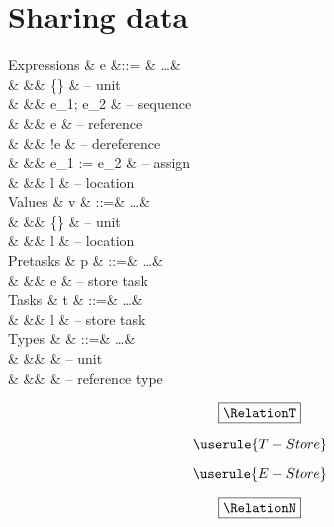 
\section{Sharing data}

\statefultrue

\begin{grammar}
  Expressions
    & e    &::= & \ldots          & \\
    &      &\mid& \{\}            & – unit \\
    &      &\mid& e_1; e_2        & – sequence \\
    &      &\mid& \Ref e          & – reference \\
    &      &\mid& !e              & – dereference \\
    &      &\mid& e_1 := e_2      & – assign \\
    &      &\mid& l               & – location \\
  Values
    & v    & ::=& \ldots          & \\
    &      &\mid& \{\}            & – unit \\
    &      &\mid& l               & – location \\
  Pretasks
    & p    & ::=& \ldots          & \\
    &      &\mid& \Store e        & – store task \\
  Tasks
    & t    & ::=& \ldots          & \\
    &      &\mid& \Store l        & – store task \\
  Types
    & \tau & ::=& \ldots          & \\
    &      &\mid& \Unit           & – unit \\
    &      &\mid& \Reference \tau & – reference type \\
\end{grammar}

\begin{equation*}
  \boxed{\RelationT}
\end{equation*}

\begin{equation*}
  \userule{T-Store}
\end{equation*}

\begin{equation*}
  \userule{E-Store}
\end{equation*}

\begin{equation*}
  \boxed{\RelationN}
\end{equation*}

